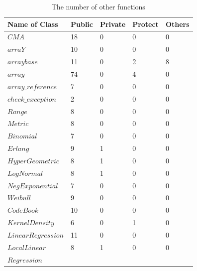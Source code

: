 \documentclass[twocolumn]{article}
\begin{document}
\begin{table}[h]
\begin{center}
\caption{The number of other functions}
\label{AppC}
\vspace*{5mm}
{\scriptsize
\begin{tabular}{|l|l|l|l|l|}\hline
Name of Class                 & Public & Private & Protect & Others  \\\hline\hline
$CMA                        $ &     18 &       0 &       0 &       0 \\\hline
$arraY                      $ &     10 &       0 &       0 &       0 \\\hline
$arraybase                  $ &     11 &       0 &       2 &       8 \\\hline
$array                      $ &     74 &       0 &       4 &       0 \\\hline
$array\_reference           $ &      7 &       0 &       0 &       0 \\\hline
$check\_exception           $ &      2 &       0 &       0 &       0 \\\hline
$Range                      $ &      8 &       0 &       0 &       0 \\\hline
$Metric                     $ &      8 &       0 &       0 &       0 \\\hline
$Binomial                   $ &      7 &       0 &       0 &       0 \\\hline
$Erlang                     $ &      9 &       1 &       0 &       0 \\\hline
$HyperGeometric             $ &      8 &       1 &       0 &       0 \\\hline
$LogNormal                  $ &      8 &       1 &       0 &       0 \\\hline
$NegExponential             $ &      7 &       0 &       0 &       0 \\\hline
$Weibull                    $ &      9 &       0 &       0 &       0 \\\hline
$CodeBook                   $ &     10 &       0 &       0 &       0 \\\hline
$KernelDensity              $ &      6 &       0 &       1 &       0 \\\hline
$LinearRegression           $ &     11 &       0 &       0 &       0 \\\hline
$LocalLinear                $ &      8 &       1 &       0 &       0 \\
\hspace*{2mm} $Regression   $ &        &         &         &         \\\hline   

\end{tabular}}
\end{center}
\end{table}
\end{document}
